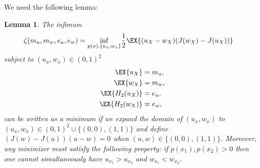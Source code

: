 \documentclass[conference,letterpaper,onecolumn]{IEEEtran}
\theoremstyle{plain}%
\newtheorem{lemma}[thm]{Lemma}
\begin{document}
We need the following lemma:
\begin{lemma}\label{lemmaMinm}
    The infimum
{\begin{align*}
    \zeta(m_u,m_w,e_u,e_w) = \inf_{p(x),\{u_x,w_x\}}&\frac{1}{2}\EX{(u_X-w_X)(J(w_X) - J(u_X))}
\end{align*}}
subject to $(u_x,w_x)\in(0,1)^2$
\begin{align*}
\EX{u_X} &= m_u,\\
    \EX{w_X} &= m_w,\\
    \EX{H_2(u_X)} &= e_u,\\
    \EX{H_2(w_X)} &= e_w,
\end{align*}
can be written as a minimum 
if we expand the domain of $(u_x,w_x)$ to 
$(u_x, w_x)\in(0,1)^2\cup \{(0,0),(1,1)\}$ and define $(J(w) - J(u))(u - w)=0$ when $(u,w)\in\{(0,0),(1,1)\}$. Moreover, any minimizer must satisfy the following property: if $p(x_1),p(x_2)>0$ then one cannot simultaneously have $u_{x_1}>u_{x_2}$ and $w_{x_1}<w_{x_2}$.
\end{lemma}
\end{document}
